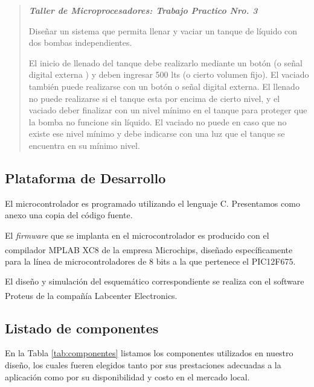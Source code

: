 \documentclass[a4paper]{article}
\let\originalcite\cite
\renewcommand{\cite}[2][]{\textsuperscript{\originalcite{#2}}}
\begin{document}
\begin{quotation}

    \begin{center}\textit{\textbf{%
        Taller de Microprocesadores: Trabajo Practico Nro. 3%
    }}\end{center}\vspace{1em}

    Diseñar un sistema que permita llenar y vaciar un tanque de líquido 
    con dos bombas independientes. 

    El inicio de llenado del tanque debe realizarlo mediante un botón 
    (o señal digital externa ) y deben ingresar 500 lts (o cierto volumen 
    fijo). El vaciado también puede realizarse con un botón o señal 
    digital externa. El llenado no puede realizarse si el tanque esta por 
    encima de cierto nivel, y el vaciado deber finalizar con un nivel 
    mínimo en el tanque para proteger que la bomba no funcione sin 
    líquido. El vaciado no puede en caso que no existe ese nivel mínimo y 
    debe indicarse con una luz que el tanque se encuentra en su mínimo 
    nivel.

\end{quotation}

\subsection{Plataforma de Desarrollo}

El microcontrolador es programado utilizando el lenguaje C. 
Presentamos como anexo una copia del código fuente.

El \textit{firmware} que se implanta en el microcontrolador es  
producido con el compilador MPLAB XC8\cite{bib:compilador} de la 
empresa Microchips, diseñado específicamente para la línea de 
microcontroladores de 8 bits a la que pertenece el PIC12F675.

El diseño y simulación del esquemático correspondiente se realiza 
con el software Proteus\cite{bib:simulador} de la compañía 
Labcenter Electronics.

\subsection{Listado de componentes}

En la Tabla \ref{tab:componentes} listamos los componentes 
utilizados en nuestro diseño, los cuales fueren elegidos tanto 
por sus prestaciones adecuadas a la aplicación como por su 
disponibilidad y costo en el mercado local.
\end{document}
